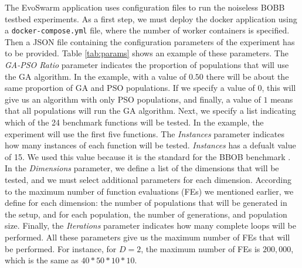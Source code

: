 \documentclass[review]{elsarticle}
\begin{document}
The EvoSwarm application uses configuration files to run the noiseless BOBB testbed
experiments.  As a first step, we must deploy the docker application using a
{\tt docker-compose.yml} file, where the number of worker containers is
specified. Then a JSON file containing the configuration parameters of the
experiment has to be provided.  Table \ref{tab:params} shows an example of these
parameters. The { \em GA-PSO Ratio} parameter indicates the proportion of
populations that will use the GA algorithm.  In the example, with a value of
$0.50$ there will be about the same proportion of GA and PSO populations. If we
specify a value of $0$, this will give us an algorithm with only PSO
populations, and finally, a value of  $1$ means that all populations will run
the GA algorithm. Next, we specify a list indicating which of the 24 benchmark
functions will be tested. In the example, the experiment will use the first five
functions.  The {\em Instances} parameter indicates how many instances of each
function will be tested. {\em Instances}  has a defualt value of 15. We used this
value because it is the standard for the BBOB benchmark \cite{hansen2016coco}.
In the {\em Dimensions} parameter, we define a list of the dimensions that will
be tested, and we must select additional parameters for each dimension.
According to the maximum number of function evaluations (FEs) we mentioned
earlier, we define for each dimension: the number of populations that will be
generated in the setup, and for each population,  the number of generations, and
population size. Finally, the {\em Iterations} parameter indicates how many
complete loops will be performed. All these parameters give us the maximum
number of FEs that will be performed. For instance, for $D = 2$, the maximum
number of FEs is $200,000$, which is the same as $40*50*10*10$.
\end{document}
